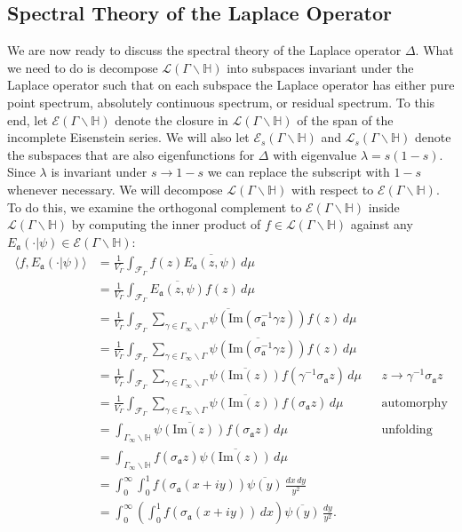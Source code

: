 \documentclass[12pt]{book}
\theoremstyle{definition}\newframedtheorem{method}{Method}
\newcommand{\mf}{\mathfrak}
\newcommand{\mc}{\mathcal}
\renewcommand{\H}{\mathbb{H}}
\newcommand{\g}{\gamma}
\renewcommand{\l}{\lambda}
\newcommand{\s}{\sigma}
\newcommand{\G}{\Gamma}
\newcommand{\D}{\Delta}
\newcommand{\<}{\langle}
\renewcommand{\>}{\rangle}
\newcommand{\conj}{\overline}
\renewcommand{\Im}{\mathrm{Im}}
\newcommand{\GH}{\G\backslash\H}
\newcommand{\GG}{\G_{\infty}\backslash\G}
\begin{document}
    \subsection*{Spectral Theory of the Laplace Operator}
      We are now ready to discuss the spectral theory of the Laplace operator $\D$. What we need to do is decompose $\mc{L}(\GH)$ into subspaces invariant under the Laplace operator such that on each subspace the Laplace operator has either pure point spectrum, absolutely continuous spectrum, or residual spectrum. To this end, let $\mc{E}(\GH)$ denote the closure in $\mc{L}(\GH)$ of the span of the incomplete Eisenstein series. We will also let $\mc{E}_{s}(\GH)$ and $\mc{L}_{s}(\GH)$ denote the subspaces that are also eigenfunctions for $\D$ with eigenvalue $\l = s(1-s)$. Since $\l$ is invariant under $s \to 1-s$ we can replace the subscript with $1-s$ whenever necessary. We will decompose $\mc{L}(\GH)$ with respect to $\mc{E}(\GH)$. To do this, we examine the orthogonal complement to $\mc{E}(\GH)$ inside $\mc{L}(\GH)$ by computing the inner product of $f \in \mc{L}(\GH)$ against any $E_{\mf{a}}(\cdot|\psi) \in \mc{E}(\GH)$:
      \begin{align*}
        \<f,E_{\mf{a}}(\cdot|\psi)\> &= \frac{1}{V_{\G}}\int_{\mc{F}_{\G}}f(z)\conj{E_{\mf{a}}(z,\psi)}\,d\mu \\
        &= \frac{1}{V_{\G}}\int_{\mc{F}_{\G}}\conj{E_{\mf{a}}(z,\psi)}f(z)\,d\mu \\
        &= \frac{1}{V_{\G}}\int_{\mc{F}_{\G}}\conj{\sum_{\g \in \GG}\psi(\Im(\s_{\mf{a}}^{-1}\g z))}f(z)\,d\mu \\
        &= \frac{1}{V_{\G}}\int_{\mc{F}_{\G}}\sum_{\g \in \GG}\conj{\psi(\Im(\s_{\mf{a}}^{-1}\g z))}f(z)\,d\mu \\
        &= \frac{1}{V_{\G}}\int_{\mc{F}_{\G}}\sum_{\g \in \GG}\conj{\psi(\Im(z))}f(\g^{-1}\s_{\mf{a}}z)\,d\mu && \text{$z \to \g^{-1}\s_{\mf{a}}z$} \\
        &= \frac{1}{V_{\G}}\int_{\mc{F}_{\G}}\sum_{\g \in \GG}\conj{\psi(\Im(z))}f(\s_{\mf{a}}z)\,d\mu  && \text{automorphy} \\
        &= \int_{\G_{\infty}\backslash\H}\conj{\psi(\Im(z))}f(\s_{\mf{a}}z)\,d\mu && \text{unfolding} \\
        &= \int_{\G_{\infty}\backslash\H}f(\s_{\mf{a}}z)\conj{\psi(\Im(z))}\,d\mu \\
        &= \int_{0}^{\infty}\int_{0}^{1}f(\s_{\mf{a}}(x+iy))\conj{\psi(y)}\,\frac{dx\,dy}{y^{2}} \\
        &= \int_{0}^{\infty}\left(\int_{0}^{1}f(\s_{\mf{a}}(x+iy))\,dx\right)\conj{\psi(y)}\,\frac{dy}{y^{2}}.
      \end{align*}
\end{document}
